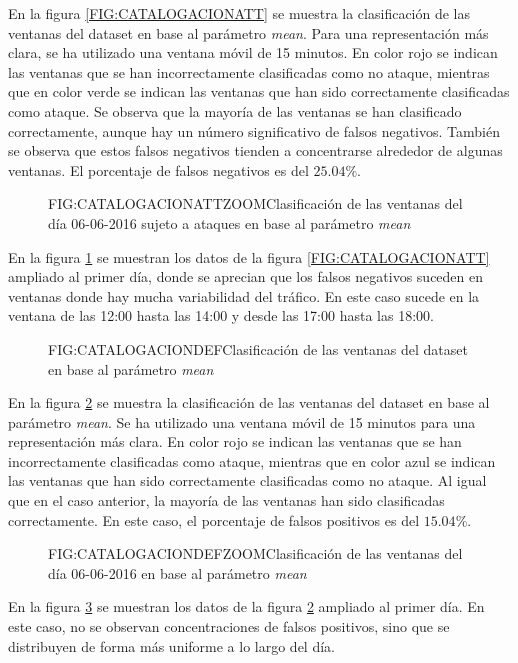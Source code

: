 En la figura \ref{FIG:CATALOGACIONATT} se muestra la clasificación de las ventanas del dataset en base al parámetro \textit{mean}. Para una representación más clara, se ha utilizado una ventana móvil de 15 minutos.
En color rojo se indican las ventanas que se han incorrectamente clasificadas como no ataque, mientras que en color verde se indican las ventanas que han sido correctamente clasificadas como ataque. Se observa que la mayoría de las ventanas se han clasificado correctamente, aunque hay un número significativo de falsos negativos. También se observa que estos falsos negativos tienden a concentrarse alrededor de algunas ventanas. El porcentaje de falsos negativos es del $25.04\%$.

\begin{figure}[Clasificación de las ventanas del día 06-06-2016 sujeto a ataques en base al parámetro \textit{mean}]{FIG:CATALOGACIONATTZOOM}{Clasificación de las ventanas del día 06-06-2016 sujeto a ataques en base al parámetro \textit{mean}}
    \label{FIG:CATALOGACIONATTZOOM}
\end{figure}

En la figura \ref{FIG:CATALOGACIONATTZOOM} se muestran los datos de la figura \ref{FIG:CATALOGACIONATT} ampliado al primer día, donde se aprecian que los falsos negativos suceden en ventanas donde hay mucha variabilidad del tráfico. En este caso sucede en la ventana de las 12:00 hasta las 14:00 y desde las 17:00 hasta las 18:00.

\begin{figure}[Clasificación de las ventanas del dataset en base al parámetro \textit{mean}]{FIG:CATALOGACIONDEF}{Clasificación de las ventanas del dataset en base al parámetro \textit{mean}}
    \label{FIG:CATALOGACIONDEF}
\end{figure}

En la figura \ref{FIG:CATALOGACIONDEF} se muestra la clasificación de las ventanas del dataset en base al parámetro \textit{mean}. Se ha utilizado una ventana móvil de 15 minutos para una representación más clara.
En color rojo se indican las ventanas que se han incorrectamente clasificadas como ataque, mientras que en color azul se indican las ventanas que han sido correctamente clasificadas como no ataque.
Al igual que en el caso anterior, la mayoría de las ventanas han sido clasificadas correctamente. En este caso, el porcentaje de falsos positivos es del $15.04\%$.

\begin{figure}[Clasificación de las ventanas del día 06-06-2016 en base al parámetro \textit{mean}]{FIG:CATALOGACIONDEFZOOM}{Clasificación de las ventanas del día 06-06-2016 en base al parámetro \textit{mean}}
    \label{FIG:CATALOGACIONDEFZOOM}
\end{figure}

En la figura \ref{FIG:CATALOGACIONDEFZOOM} se muestran los datos de la figura \ref{FIG:CATALOGACIONDEF} ampliado al primer día. En este caso, no se observan concentraciones de falsos positivos, sino que se distribuyen de forma más uniforme a lo largo del día.